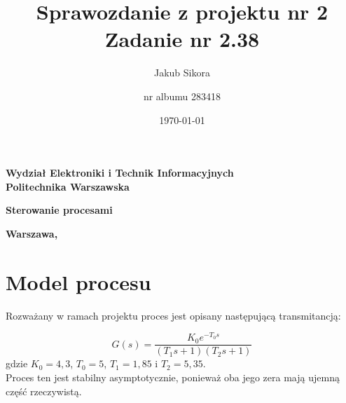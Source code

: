 \documentclass[a4paper,titlepage,11pt,floatssmall]{mwrep}
\title{\bf Sprawozdanie z projektu nr 2\\ Zadanie nr 2.38  \vskip 0.1cm}
\author{Jakub Sikora \and nr albumu 283418}
\date{\today}
\begin{document}
\makeatletter
\renewcommand{\maketitle}{\begin{titlepage}
		\begin{center}{\LARGE {\bf
					Wydział Elektroniki i Technik Informacyjnych}}\\
			\vspace{0.4cm}
			{\LARGE {\bf Politechnika Warszawska}}\\
			\vspace{0.3cm}
		\end{center}
		\vspace{5cm}
		\begin{center}
			{\bf \LARGE Sterowanie procesami \vskip 0.1cm}
		\end{center}
		\vspace{1cm}
		\begin{center}
			{\bf \LARGE \@title}
		\end{center}
		\vspace{2cm}
		\begin{center}
			{\bf \Large \@author \par}
		\end{center}
		\vspace*{\stretch{6}}
		\begin{center}
			\bf{\large{Warszawa, \@date\vskip 0.1cm}}
		\end{center}
	\end{titlepage}
	}
\makeatother
\maketitle

\tableofcontents


\chapter{Model procesu }
Rozważany w ramach projektu proces jest opisany następującą transmitancją:

\begin{equation*}
G(s) = \frac{K_0 e^{-T_0 s}}{(T_1 s + 1)(T_2 s + 1)}
\end{equation*} 
\medskip
gdzie $K_0 = 4,3$, $T_0 = 5$, $T_1 = 1,85$ i  $T_2 = 5,35$.\\
Proces ten jest stabilny asymptotycznie, ponieważ oba jego zera mają ujemną część rzeczywistą.
\end{document}
